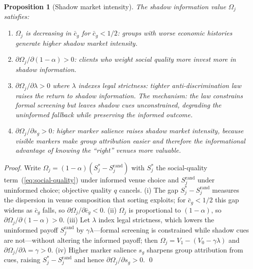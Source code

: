 \documentclass[pdflatex,sn-basic]{sn-jnl}
\theoremstyle{thmstyleone}
\newtheorem{proposition}{Proposition}
\numberwithin{proposition}{subsection}
\begin{document}
\begin{proposition}[Shadow market intensity]
\label{prop:shadow}
The shadow information value $\Omega_j$ satisfies:
\begin{enumerate}[noitemsep]
  \item $\Omega_j$ is decreasing in $\bar{c}_g$ for $\bar{c}_g < 1/2$:
  groups with worse economic histories generate higher shadow market
  intensity.
  \item $\partial \Omega_j / \partial (1-\alpha) > 0$: clients who
  weight social quality more invest more in shadow information.
  \item $\partial \Omega_j / \partial \lambda > 0$ where $\lambda$
  indexes legal strictness: tighter anti-discrimination law raises
  the return to shadow information. The mechanism: the law constrains
  formal screening but leaves shadow cues unconstrained, degrading
  the uninformed fallback while preserving the informed outcome.
  \item $\partial \Omega_j / \partial s_g > 0$: higher marker
  salience raises shadow market intensity, because visible markers
  make group attribution easier and therefore the informational
  advantage of knowing the ``right'' venues more valuable.
\end{enumerate}
\end{proposition}

\begin{proof}
Write $\Omega_j = (1-\alpha)(S_j^{*} - S_j^{\mathrm{rand}})$ with $S_j^*$
the social-quality term~(\ref{eq:social-quality}) under informed venue
choice and $S_j^{\mathrm{rand}}$ under uninformed choice; objective
quality $q$ cancels. (i) The gap $S_j^{*} - S_j^{\mathrm{rand}}$ measures
the dispersion in venue composition that sorting exploits; for
$\bar{c}_g < 1/2$ this gap widens as $\bar{c}_g$ falls, so
$\partial \Omega_j / \partial \bar{c}_g < 0$. (ii) $\Omega_j$ is
proportional to $(1-\alpha)$, so
$\partial \Omega_j / \partial (1-\alpha) > 0$. (iii) Let $\lambda$ index
legal strictness, which lowers the uninformed payoff
$S_j^{\mathrm{rand}}$ by $\gamma\lambda$---formal screening is
constrained while shadow cues are not---without altering the informed
payoff; then $\Omega_j = V_1 - (V_0 - \gamma\lambda)$ and
$\partial \Omega_j / \partial \lambda = \gamma > 0$. (iv) Higher marker
salience $s_g$ sharpens group attribution from cues, raising
$S_j^{*} - S_j^{\mathrm{rand}}$ and hence
$\partial \Omega_j / \partial s_g > 0$. \qed
\end{proof}
\end{document}
